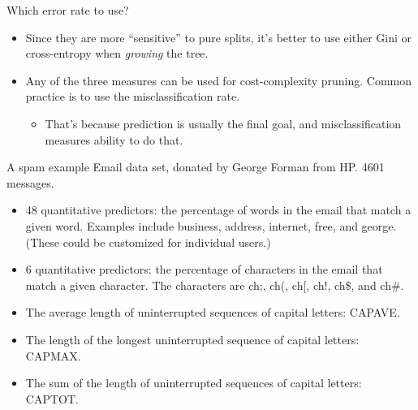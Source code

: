 \documentclass[mathserif, aspectratio=169]{beamer}
\begin{document}
\begin{frame}{Which error rate to use?}

\begin{itemize}
\item Since they are more ``sensitive'' to pure splits, it's better to use either Gini or cross-entropy when \textit{growing} the tree. 
\item Any of the three measures can be used for cost-complexity pruning.  Common practice is to use the misclassification rate.
\begin{itemize}
\item That's because prediction is usually the final goal, and misclassification measures ability to do that.
\end{itemize}
\end{itemize}
\end{frame}

\begin{frame}{A spam example}
Email data set, donated by George Forman from HP.  4601 messages.  


\begin{itemize}
\item 48 quantitative predictors: the percentage of words in the email that match a given word. Examples include business, address, internet, free, and george. (These could be customized for individual users.)
\item 6 quantitative predictors: the percentage of characters in the email that match a given character. The characters are ch;, ch(, ch[, ch!, ch\$, and ch\#.
\item The average length of uninterrupted sequences of capital letters: CAPAVE.
\item The length of the longest uninterrupted sequence of capital letters: CAPMAX.
\item The sum of the length of uninterrupted sequences of capital letters: CAPTOT.
\end{itemize}

\end{frame}
\end{document}
